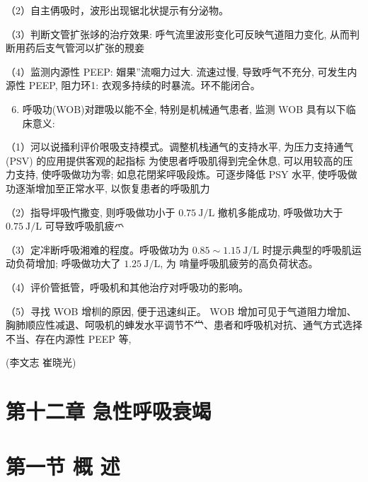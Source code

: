 \documentclass[10pt]{article}
\begin{document}
（2）自主侢吸时，波形出现锯北状提示有分泌物。

（3）判断文管扩张䇋的治疗效果: 呼气流里波形变化可反映气道阻力变化, 从而判断用药后支气管河以扩张的䙹妾

（4）监测内源性 PEEP: 媢果”流唨力过大. 流速过慢, 导致呼气不充分, 可发生内源性 PEEP, 阻力环1: 衣观多持续的时暴流。环不能闭合。

\begin{enumerate}
  \setcounter{enumi}{5}
  \item 呼吸功(WOB)对跇吸以能不全, 特别是机械通气患者, 监测 WOB 具有以下临床意义:
\end{enumerate}

（1）河以说掻利评价哏吸支持模式。调整机栈通气的支持水平, 为压力支持通气(PSV) 的应用提供客观的起指标 为使思者呼吸肌得到完全休息, 可以用较高的压力支持, 使呼吸做功为零; 如息花閉桨呯吸段炼。可逐步降低 PSY 水平, 使呼吸做功逐渐增加至正常水平, 以恢复患者的呼吸肌力

（2）指导坪吸忾撒变, 则呼吸做功小于 $0.75 \mathrm{~J} / \mathrm{L}$ 撤机多能成功, 呼吸做功大于 $0.75 \mathrm{~J} / \mathrm{L}$ 可导致呼吸肌疲爫

（3）定冸断呼吸湘难的程度。呼吸做功为 $0.85 \sim 1.15 \mathrm{~J} / \mathrm{L}$ 时提示典型的呼吸肌运动负荷增加; 呼吸做功大了 $1.25 \mathrm{~J} / \mathrm{L}$, 为 啃量呼吸肌疲劳的高负荷状态。

（4）评价管抵管，呼吸机和其他治疗对呼吸功的影响。

（5）寻找 WOB 增杊的原因, 便于迅速纠正。 WOB 增加可见于气道阻力增加、胸肺顺应性减退、呵吸机的蛼发水平调节不龸、患者和呼吸机对抗、通气方式选择不当、存在内源性 PEEP 等,

(李文志 崔晓光)

\section*{第十二章 急性呼吸衰竭}
\section*{第一节 概 述}
\end{document}
